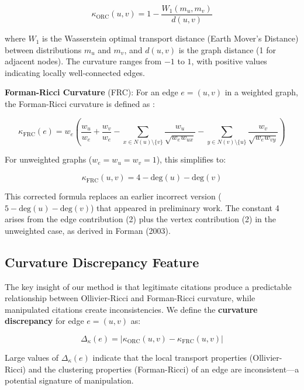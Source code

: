 \documentclass[11pt,letterpaper]{article}
\begin{document}
\begin{equation}
  \kappa_{\text{ORC}}(u,v) = 1 - \frac{W_1(m_u, m_v)}{d(u,v)}
\end{equation}

where $W_1$ is the Wasserstein optimal transport distance (Earth Mover's Distance) between distributions $m_u$ and $m_v$, and $d(u,v)$ is the graph distance (1 for adjacent nodes). The curvature ranges from $-1$ to $1$, with positive values indicating locally well-connected edges.

\textbf{Forman-Ricci Curvature} (FRC): For an edge $e = (u,v)$ in a weighted graph, the Forman-Ricci curvature is defined as \cite{Forman2003}:

\begin{equation}
  \kappa_{\text{FRC}}(e) = w_e\left(\frac{w_u}{w_e} + \frac{w_v}{w_e} - \sum_{x \in N(u)\setminus\{v\}} \frac{w_u}{\sqrt{w_e w_{ux}}} - \sum_{y \in N(v)\setminus\{u\}} \frac{w_v}{\sqrt{w_e w_{vy}}}\right)
\end{equation}

For unweighted graphs ($w_e = w_u = w_v = 1$), this simplifies to:

\begin{equation}
  \kappa_{\text{FRC}}(u,v) = 4 - \text{deg}(u) - \text{deg}(v)
\end{equation}

This corrected formula replaces an earlier incorrect version ($5 - \text{deg}(u) - \text{deg}(v)$) that appeared in preliminary work. The constant 4 arises from the edge contribution (2) plus the vertex contribution (2) in the unweighted case, as derived in Forman (2003).

\subsection{Curvature Discrepancy Feature}

The key insight of our method is that legitimate citations produce a predictable relationship between Ollivier-Ricci and Forman-Ricci curvature, while manipulated citations create inconsistencies. We define the \textbf{curvature discrepancy} for edge $e = (u,v)$ as:

\begin{equation}
  \Delta_\kappa(e) = |\kappa_{\text{ORC}}(u,v) - \kappa_{\text{FRC}}(u,v)|
\end{equation}

Large values of $\Delta_\kappa(e)$ indicate that the local transport properties (Ollivier-Ricci) and the clustering properties (Forman-Ricci) of an edge are inconsistent---a potential signature of manipulation.
\end{document}
